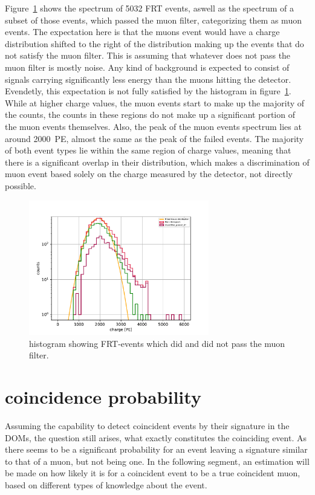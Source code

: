 Figure~\ref{fig:frt_mu_2} shows the spectrum of \num{5032} FRT events, aswell as the spectrum of a subset of those events, which passed the muon filter, categorizing 
them as muon events. The expectation here is that the muons event would have a charge distribution shifted to the right of the distribution making up the events 
that do not satisfy the muon filter. This is assuming that whatever does not pass the muon filter is mostly noise. Any kind of background is expected to consist
of signals carrying significantly less energy than the muons hitting the detector. Evendetly, this expectation is not fully satisfied by the histogram in 
figure~\ref{fig:frt_mu_2}. While at higher charge values, the muon events start to make up the majority of the counts, the counts in these regions do not make up 
a significant portion of the muon events themselves. Also, the peak of the muon events spectrum lies at around \num{2000}~PE, almost the same as the peak of the 
failed events. The majority of both event types lie within the same region of charge values, meaning that there is a significant overlap in their distribution, 
which makes a discrimination of muon event based solely on the charge measured by the detector, not directly possible. 
\begin{figure}
    \centering
    \includegraphics[width=0.7\textwidth]{Plots/frt_muon_filter.pdf}
    \caption{histogram showing FRT-events which did and did not pass the muon filter.}
    \label{fig:frt_mu_2}
\end{figure}


\section{coincidence probability}

Assuming the capability to detect coincident events by their signature in the DOMs, the question still arises, what exactly constitutes the coinciding event. As 
there seems to be a significant probability for an event leaving a signature similar to that of a muon, but not being one. In the following segment, an estimation
will be made on how likely it is for a coincident event to be a true coincident muon, based on different types of knowledge about the event. 